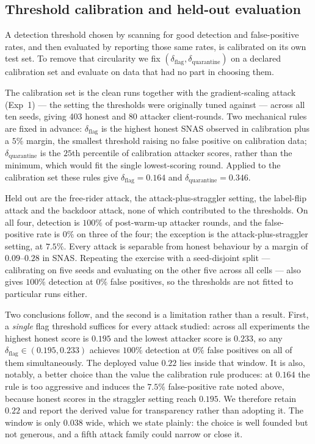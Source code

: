 \documentclass[pdflatex,sn-mathphys-num]{sn-jnl}
\begin{document}
\subsection{Threshold calibration and held-out evaluation}\label{sec:calibration}

A detection threshold chosen by scanning for good detection and false-positive rates, and then evaluated by reporting those same rates, is calibrated on its own test set. To remove that circularity we fix $(\delta_{\mathrm{flag}}, \delta_{\mathrm{quarantine}})$ on a declared calibration set and evaluate on data that had no part in choosing them.

The calibration set is the clean runs together with the gradient-scaling attack (Exp~1) --- the setting the thresholds were originally tuned against --- across all ten seeds, giving 403 honest and 80 attacker client-rounds. Two mechanical rules are fixed in advance: $\delta_{\mathrm{flag}}$ is the highest honest SNAS observed in calibration plus a $5\%$ margin, the smallest threshold raising no false positive on calibration data; $\delta_{\mathrm{quarantine}}$ is the $25$th percentile of calibration attacker scores, rather than the minimum, which would fit the single lowest-scoring round. Applied to the calibration set these rules give $\delta_{\mathrm{flag}}=0.164$ and $\delta_{\mathrm{quarantine}}=0.346$.

Held out are the free-rider attack, the attack-plus-straggler setting, the label-flip attack and the backdoor attack, none of which contributed to the thresholds. On all four, detection is $100\%$ of post-warm-up attacker rounds, and the false-positive rate is $0\%$ on three of the four; the exception is the attack-plus-straggler setting, at $7.5\%$. Every attack is separable from honest behaviour by a margin of $0.09$--$0.28$ in SNAS. Repeating the exercise with a seed-disjoint split --- calibrating on five seeds and evaluating on the other five across all cells --- also gives $100\%$ detection at $0\%$ false positives, so the thresholds are not fitted to particular runs either.

Two conclusions follow, and the second is a limitation rather than a result. First, a \emph{single} flag threshold suffices for every attack studied: across all experiments the highest honest score is $0.195$ and the lowest attacker score is $0.233$, so any $\delta_{\mathrm{flag}}\in(0.195, 0.233)$ achieves $100\%$ detection at $0\%$ false positives on all of them simultaneously. The deployed value $0.22$ lies inside that window. It is also, notably, a better choice than the value the calibration rule produces: at $0.164$ the rule is too aggressive and induces the $7.5\%$ false-positive rate noted above, because honest scores in the straggler setting reach $0.195$. We therefore retain $0.22$ and report the derived value for transparency rather than adopting it. The window is only $0.038$ wide, which we state plainly: the choice is well founded but not generous, and a fifth attack family could narrow or close it.
\end{document}
